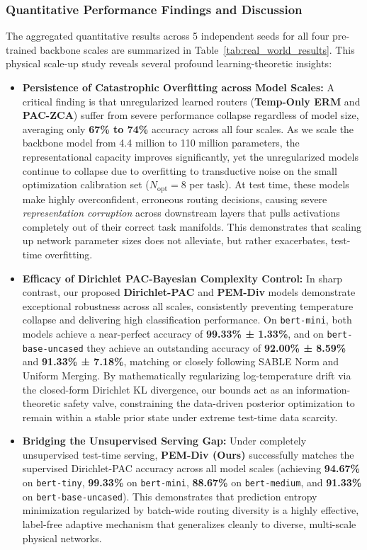 \subsubsection{Quantitative Performance Findings and Discussion}
The aggregated quantitative results across 5 independent seeds for all four pre-trained backbone scales are summarized in Table~\ref{tab:real_world_results}. This physical scale-up study reveals several profound learning-theoretic insights:
\begin{itemize}
    \item \textbf{Persistence of Catastrophic Overfitting across Model Scales:} A critical finding is that unregularized learned routers (\textbf{Temp-Only ERM} and \textbf{PAC-ZCA}) suffer from severe performance collapse regardless of model size, averaging only \textbf{67\% to 74\%} accuracy across all four scales. As we scale the backbone model from 4.4 million to 110 million parameters, the representational capacity improves significantly, yet the unregularized models continue to collapse due to overfitting to transductive noise on the small optimization calibration set ($N_{\text{opt}} = 8$ per task). At test time, these models make highly overconfident, erroneous routing decisions, causing severe \emph{representation corruption} across downstream layers that pulls activations completely out of their correct task manifolds. This demonstrates that scaling up network parameter sizes does not alleviate, but rather exacerbates, test-time overfitting.
    \item \textbf{Efficacy of Dirichlet PAC-Bayesian Complexity Control:} In sharp contrast, our proposed \textbf{Dirichlet-PAC} and \textbf{PEM-Div} models demonstrate exceptional robustness across all scales, consistently preventing temperature collapse and delivering high classification performance. On \texttt{bert-mini}, both models achieve a near-perfect accuracy of \textbf{99.33\% ± 1.33\%}, and on \texttt{bert-base-uncased} they achieve an outstanding accuracy of \textbf{92.00\% ± 8.59\%} and \textbf{91.33\% ± 7.18\%}, matching or closely following SABLE Norm and Uniform Merging. By mathematically regularizing log-temperature drift via the closed-form Dirichlet KL divergence, our bounds act as an information-theoretic safety valve, constraining the data-driven posterior optimization to remain within a stable prior state under extreme test-time data scarcity.
    \item \textbf{Bridging the Unsupervised Serving Gap:} Under completely unsupervised test-time serving, \textbf{PEM-Div (Ours)} successfully matches the supervised Dirichlet-PAC accuracy across all model scales (achieving \textbf{94.67\%} on \texttt{bert-tiny}, \textbf{99.33\%} on \texttt{bert-mini}, \textbf{88.67\%} on \texttt{bert-medium}, and \textbf{91.33\%} on \texttt{bert-base-uncased}). This demonstrates that prediction entropy minimization regularized by batch-wide routing diversity is a highly effective, label-free adaptive mechanism that generalizes cleanly to diverse, multi-scale physical networks.
\end{itemize}

